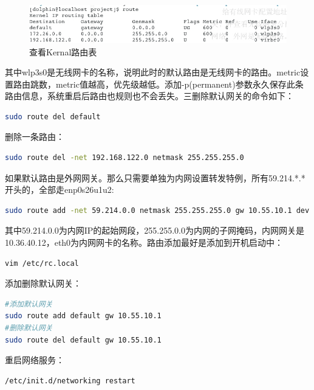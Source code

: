 \documentclass[letter]{book}
\begin{document}
\begin{figure}[htbp]
	\centering
	\includegraphics[scale=0.4]{route-table.jpg}
	\caption{查看Kernal路由表}
	\label{fig:routetable}
\end{figure}

其中wlp3s0是无线网卡的名称，说明此时的默认路由是无线网卡的路由。metric设置路由跳数，metric值越高，优先级越低。添加-p(permanent)参数永久保存此条路由信息，系统重启后路由也规则也不会丢失。三删除默认网关的命令如下：

\begin{lstlisting}[language=Bash]
sudo route del default
\end{lstlisting}

删除一条路由：

\begin{lstlisting}[language=Bash]
sudo route del -net 192.168.122.0 netmask 255.255.255.0
\end{lstlisting}

如果默认路由是外网网关。那么只需要单独为内网设置转发特例，所有59.214.*.*开头的，全部走enp0s26u1u2:

\begin{lstlisting}[language=Bash]
sudo route add -net 59.214.0.0 netmask 255.255.255.0 gw 10.55.10.1 dev enp0s26u1u2
\end{lstlisting}

其中59.214.0.0为内网IP的起始网段，255.255.0.0为内网的子网掩码，内网网关是10.36.40.12，eth0为内网网卡的名称。路由添加最好是添加到开机启动中：

\begin{lstlisting}[language=Bash]
vim /etc/rc.local
\end{lstlisting}

添加删除默认网关：

\begin{lstlisting}[language=Bash]
#添加默认网关
sudo route add default gw 10.55.10.1
#删除默认网关
sudo route del default gw 10.55.10.1
\end{lstlisting}

重启网络服务：

\begin{lstlisting}[language=Bash]
/etc/init.d/networking restart
\end{lstlisting}
\end{document}
